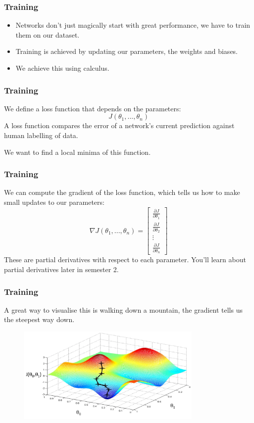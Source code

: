 \documentclass{beamer}
\begin{document}
\begin{frame}
    \frametitle{Training}
    \begin{itemize}
        \item Networks don't just magically start with great performance, we have to \alert{train} them on our dataset. \pause
        \item \alert{Training} is achieved by updating our \alert{parameters}, the weights and biases. \pause
        \item We achieve this using \alert{calculus}.
    \end{itemize}
\end{frame}

\begin{frame}
    \frametitle{Training}
    We define a \alert{loss function} that depends on the parameters:
    \[J(\theta_1,... , \theta_n)\]
    A loss function compares the error of a network's current prediction against human labelling of data. 
    \vspace{0.5cm}

    We want to find a local minima of this function. 
\end{frame}

\begin{frame}
    \frametitle{Training}
    We can compute the \alert{gradient} of the loss function, which tells us how to make small updates to our parameters:
    \[\nabla J(\theta_1,... , \theta_n) = \begin{bmatrix}
        \frac{\partial J}{\partial \theta_1} \\[6pt]
        \frac{\partial J}{\partial \theta_2} \\[6pt]
        \vdots \\[6pt]
        \frac{\partial J}{\partial \theta_n}
    \end{bmatrix}\]
    These are partial derivatives with respect to each parameter. You'll learn about partial derivatives later in semester 2. 
\end{frame}

\begin{frame}
    \frametitle{Training}
    A great way to visualise this is walking down a mountain, the gradient tells us the steepest way down. 
    \begin{figure}
        \centering
        \includegraphics[width=0.8\textwidth]{images/gradient-descent.png}
    \end{figure}
\end{frame}
\end{document}
